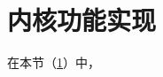 \section{内核功能实现}\label{sec:KernelFunctionalityImplementation}

在本节（\cref{sec:KernelFunctionalityImplementation}）中，